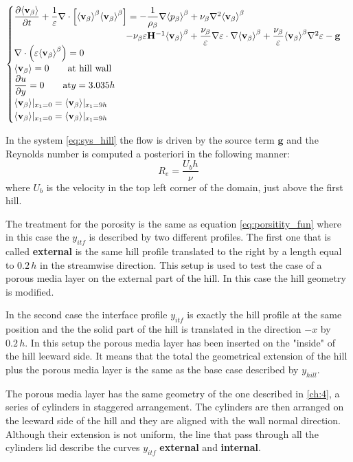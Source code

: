 \begin{eqnarray}
\begin{cases}
\dfrac{\partial {\left< \textbf{v}_{\beta} \right>}}{\partial t} + \dfrac{1}{\varepsilon} \nabla \cdot \left[  {\left< \textbf{v}_{\beta} \right>}^{\beta}  {\left< \textbf{v}_{\beta} \right>}^{\beta} \right] = -\dfrac{1}{\rho_{\beta}} \nabla {\left< p_{\beta}\right>}^{\beta} + \nu_{\beta} \nabla^2 {\left< \textbf{v}_{\beta} \right>}^{\beta} \\ 
\qquad \qquad \qquad \qquad \qquad \qquad- \nu_{\beta} \varepsilon \mathbf{H}^{-1} {\left< \textbf{v}_{\beta} \right>}^{\beta} +\dfrac{\nu_{\beta}}{\varepsilon} \nabla \varepsilon \cdot \nabla {\left< \textbf{v}_{\beta} \right>}^{\beta} + \dfrac{\nu_{\beta}}{\varepsilon} {\left< \textbf{v}_{\beta} \right>}^{\beta} \nabla^2 \varepsilon - \mathbf{g}\\
\nabla \cdot \left(\varepsilon {\left< \textbf{v}_{\beta} \right>}^{\beta} \right) = 0\\
{\left< \textbf{v}_{\beta} \right>} = 0 \qquad \textrm{at hill wall} \\
\dfrac{\partial u}{\partial y}=0 \qquad \textrm{at} y = 3.035h\\
{\left< \textbf{v}_{\beta} \right>}|_{x_1 = 0} = {\left< \textbf{v}_{\beta} \right>}|_{x_1 = 9h} \\
{\left< \textbf{v}_{\beta} \right>}|_{x_1 = 0} = {\left< \textbf{v}_{\beta} \right>}|_{x_1 = 9h} 
\end{cases}
\label{eq:sys_hill}
\end{eqnarray}

In the system \eqref{eq:sys_hill} the flow is driven by the source term $\mathbf{g}$ and the Reynolds number is computed a posteriori in the following manner:
$$
R_e = \dfrac{U_b h}{\nu}
$$
where $U_b$ is the velocity in the top left corner of the domain, just above the first hill.

The treatment for the porosity is the same as equation \eqref{eq:porsitity_fun} where in this case the $y_{itf}$ is described by two different profiles.
The first one that is called \textbf{external} is the same hill profile translated to the right by a length equal to $0.2\,h$ in the streamwise direction. This setup is used to test the case of a porous media layer on the external part of the hill. In this case the hill geometry is modified.

In the second case the interface profile $y_{itf}$ is exactly the hill profile at the same position and the the solid part of the hill is translated in the direction $-x$ by $0.2\,h$. In this setup the porous media layer has been inserted on the "inside" of the hill leeward side. It means that the total the geometrical extension of the hill plus the porous media layer is the same as the base case described by $y_{hill}$.

The porous media layer has the same geometry of the one described in \ref{ch:4}, a series of cylinders in staggered arrangement. The cylinders are then arranged on the leeward side of the hill and they are aligned with the wall normal direction. Although their extension is not uniform, the line that pass through all the cylinders lid describe the curves $y_{itf}$ \textbf{external} and \textbf{internal}.

